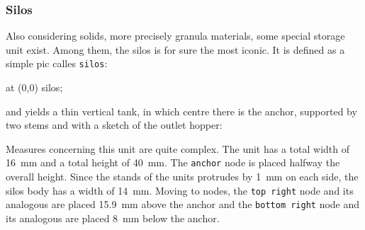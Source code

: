 \documentclass[12pt]{article}						%
\newcommand*{\chpn}[1]{\texttt{#1}}				%
\newcommand*{\chpp}[1]{\texttt{#1}}				%
\begin{document}
\subsubsection{Silos}

Also considering solids, more precisely granula materials, some special storage
unit exist. Among them, the silos is for sure the most iconic. It is defined as a
simple pic calles \chpp{silos}:
\begin{chpcode}
	\pic at (0,0) {silos};
\end{chpcode}
and yields a thin vertical tank, in which centre there is the anchor, supported
by two stems and with a sketch of the outlet hopper:
\begin{center}
\end{center}

Measures concerning this unit are quite complex. The unit has a total width of
\SI{16}{\mm} and a total height of \SI{40}{\mm}. The \chpn{anchor} node is placed
halfway the overall height. Since the stands of the units protrudes by
\SI{1}{\mm} on each side, the silos body has a width of \SI{14}{\mm}. Moving to
nodes, the \chpn{top right} node and its analogous are placed \SI{15.9}{\mm}
above the anchor and the \chpn{bottom right} node and its analogous are placed
\SI{8}{\mm} below the anchor.
\end{document}

